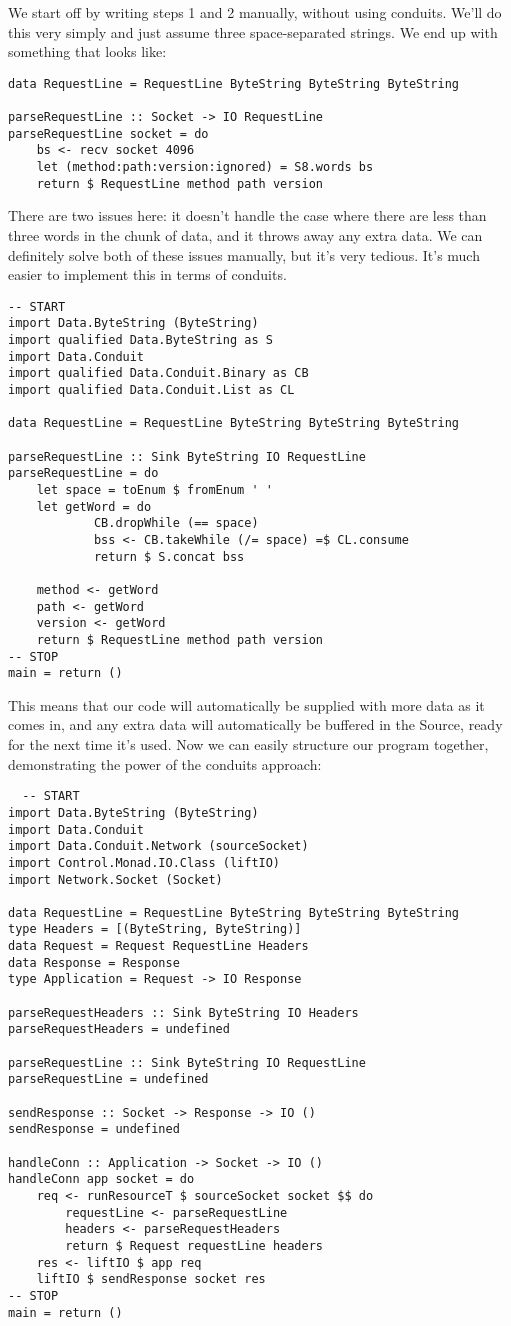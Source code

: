 We start off by writing steps 1 and 2 manually, without using conduits. We'll do this very
simply and just assume three space-separated strings. We end up with something that looks
like:
\begin{lstlisting}
data RequestLine = RequestLine ByteString ByteString ByteString

parseRequestLine :: Socket -> IO RequestLine
parseRequestLine socket = do
    bs <- recv socket 4096
    let (method:path:version:ignored) = S8.words bs
    return $ RequestLine method path version
\end{lstlisting}
There are two issues here: it doesn't handle the case where there are less than three
words in
the chunk of data, and it throws away any extra data. We can definitely solve both of
these
issues manually, but it's very tedious. It's much easier to implement this in terms of
conduits.
\begin{lstlisting}
-- START
import Data.ByteString (ByteString)
import qualified Data.ByteString as S
import Data.Conduit
import qualified Data.Conduit.Binary as CB
import qualified Data.Conduit.List as CL

data RequestLine = RequestLine ByteString ByteString ByteString

parseRequestLine :: Sink ByteString IO RequestLine
parseRequestLine = do
    let space = toEnum $ fromEnum ' '
    let getWord = do
            CB.dropWhile (== space)
            bss <- CB.takeWhile (/= space) =$ CL.consume
            return $ S.concat bss

    method <- getWord
    path <- getWord
    version <- getWord
    return $ RequestLine method path version
-- STOP
main = return ()
\end{lstlisting}
This means that our code will automatically be supplied with more data as it comes in, and
any
extra data will automatically be buffered in the Source, ready for the next time
it's used. Now we can easily structure our program together, demonstrating the power of
the
conduits approach:
\begin{lstlisting}
  -- START
import Data.ByteString (ByteString)
import Data.Conduit
import Data.Conduit.Network (sourceSocket)
import Control.Monad.IO.Class (liftIO)
import Network.Socket (Socket)

data RequestLine = RequestLine ByteString ByteString ByteString
type Headers = [(ByteString, ByteString)]
data Request = Request RequestLine Headers
data Response = Response
type Application = Request -> IO Response

parseRequestHeaders :: Sink ByteString IO Headers
parseRequestHeaders = undefined

parseRequestLine :: Sink ByteString IO RequestLine
parseRequestLine = undefined

sendResponse :: Socket -> Response -> IO ()
sendResponse = undefined

handleConn :: Application -> Socket -> IO ()
handleConn app socket = do
    req <- runResourceT $ sourceSocket socket $$ do
        requestLine <- parseRequestLine
        headers <- parseRequestHeaders
        return $ Request requestLine headers
    res <- liftIO $ app req
    liftIO $ sendResponse socket res
-- STOP
main = return ()
\end{lstlisting}
